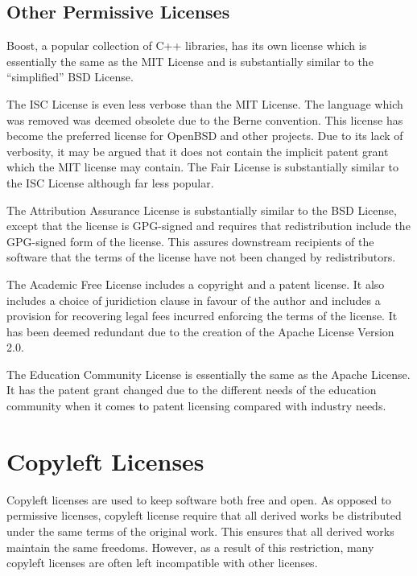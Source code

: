 \documentclass[12pt,letterpaper]{article}
\begin{document}
\subsection{Other Permissive Licenses}

Boost, a popular collection of C++ libraries, has its own license which is essentially the same as the MIT License and is substantially similar to the ``simplified'' BSD License. \cite{boost}

The ISC License is even less verbose than the MIT License. The language which was removed was deemed obsolete due to the Berne convention. This license has become the preferred license for OpenBSD and other projects.\cite{openbsd} Due to its lack of verbosity, it may be argued that it does not contain the implicit patent grant which the MIT license may contain. The Fair License is substantially similar to the ISC License although far less popular.\cite{fair}

The Attribution Assurance License is substantially similar to the BSD License, except that the license is GPG-signed and requires that redistribution include the GPG-signed form of the license. This assures downstream recipients of the software that the terms of the license have not been changed by redistributors.\cite{attrassur}

The Academic Free License includes a copyright and a patent license. It also includes a choice of juridiction clause in favour of the author and includes a provision for recovering legal fees incurred enforcing the terms of the license. It has been deemed redundant due to the creation of the Apache License Version 2.0.\cite{academic}

The Education Community License is essentially the same as the Apache License. It has the patent grant changed due to the different needs of the education community when it comes to patent licensing compared with industry needs.\cite{education}

\section{Copyleft Licenses}

Copyleft licenses are used to keep software both free and open. As opposed to permissive licenses, copyleft license require that all derived works be distributed under the same terms of the original work. This ensures that all derived works maintain the same freedoms. However, as a result of this restriction, many copyleft licenses are often left incompatible with other licenses. \cite{copyleft}
\end{document}
